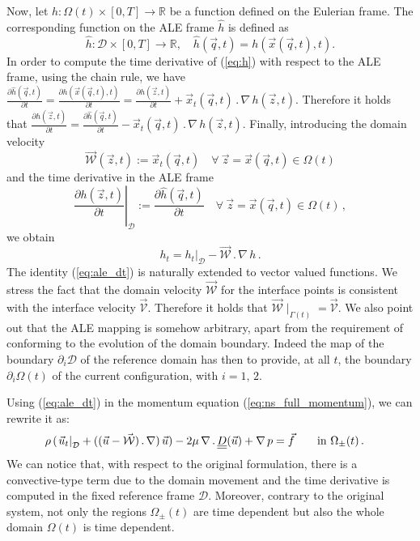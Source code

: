 \documentclass[a4paper,12pt,onecolumn]{article}
\newcommand{\R}{\mathbb R}
\newcommand{\D}{\mathcal D}
\newcommand{\W}{\vec{\mathcal W}}
\newcommand{\mat}[1]{\underline{\underline{#1}}\rule{0pt}{0pt}}
\newcommand{\V}{\vec{\mathcal{V}}} %
\begin{document}
Now, let $h:\Omega(t)\times [0,T]\to \R$ be a function defined on the Eulerian
frame. The corresponding function on the ALE frame $\hat h$ is defined as
\begin{equation}\label{eq:h}
\hat h:\D\times [0,T]\to \R,\quad \hat h(\vec q,t)=h(\vec x(\vec q,t),t).
\end{equation}
In order to compute the time derivative of (\ref{eq:h}) with respect to the ALE
frame, using the chain rule, we have
$\frac{\partial\hat h(\vec q,t)}{\partial t}=\frac{\partial h(\vec x(\vec
q,t),t)}{\partial t}=\frac{\partial h(\vec z,t)}{\partial t}+\vec x_t(\vec q,t)
\,.\, \nabla\, h(\vec z,t)$. Therefore it holds that
$\frac{\partial h(\vec z,t)}{\partial t} =
\frac{\partial\hat h(\vec q,t)}{\partial t}-
\vec x_t(\vec q,t) \,.\, \nabla\, h(\vec z,t)$.
Finally, introducing the domain velocity
\begin{equation} \label{eq:W}
\W(\vec z, t) := \vec x_t(\vec q, t) \quad \forall\ \vec z = \vec x(\vec q,t)
\in \Omega(t)
\end{equation}
and the time derivative in the ALE frame
\begin{equation} \label{eq:ale_derivative}
\left.\frac{\partial h(\vec z,t)}{\partial t}\right|_{\D}:=
\frac{\partial\hat h(\vec q,t)}{\partial t} \quad
\forall\ \vec z = \vec x(\vec q,t) \in \Omega(t)\,,
\end{equation}
we obtain
\begin{equation}\label{eq:ale_dt}
h_t =\left.h_t\right|_{\D} -\vec{\mathcal{W}}\,.\,\nabla\, h\,.
\end{equation}
The identity (\ref{eq:ale_dt}) is naturally extended to vector valued functions.
We stress the fact that the domain velocity $\W$ for the interface points is
consistent with the interface velocity $\V$. Therefore it holds that
$\W\!\mid_{\Gamma(t)}=\V$.
We also point out that the ALE mapping is somehow arbitrary, apart from the
requirement of conforming to the evolution of the domain boundary. Indeed the
map of the boundary $\partial_i \D$ of the reference domain has then to
provide, at all $t$, the boundary $\partial_i \Omega(t)$ of the current
configuration, with $i=1,\,2$.

Using (\ref{eq:ale_dt}) in the momentum equation (\ref{eq:ns_full_momentum}),
we can rewrite it as:
\begin{align}
\rho\,(\left.\vec u_t\right|_{\D} +((\vec u - \W)\,.\, \nabla)\, \vec u)
 -2 \mu\,\nabla\,.\,\mat D(\vec u)+ \nabla\,p & = \vec f
\quad &&\mbox{in } \Omega_\pm(t)\,. \label{eq:ns_full_momentum_ale}
\end{align}
We can notice that, with respect to the original formulation, there is a
convective-type term due to the domain movement and the time derivative is
computed in the fixed reference frame $\D$. Moreover, contrary to the original
system, not only the regions $\Omega_\pm(t)$ are time dependent but also the
whole domain $\Omega(t)$ is time dependent.
\end{document}
